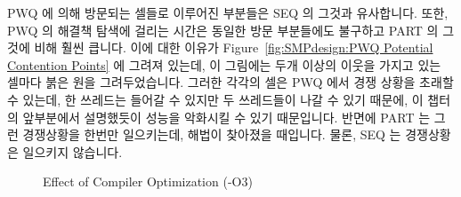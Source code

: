 PWQ 에 의해 방문되는 셀들로 이루어진 부분들은 SEQ 의 그것과 유사합니다.
또한, PWQ 의 해결책 탐색에 걸리는 시간은 동일한 방문 부분들에도 불구하고 PART
의 그것에 비해 훨씬 큽니다.
이에 대한 이유가 Figure~\ref{fig:SMPdesign:PWQ Potential Contention Points} 에
그려져 있는데, 이 그림에는 두개 이상의 이웃을 가지고 있는 셀마다 붉은 원을
그려두었습니다.
그러한 각각의 셀은 PWQ 에서 경쟁 상황을 초래할 수 있는데, 한 쓰레드는 들어갈 수
있지만 두 쓰레드들이 나갈 수 있기 때문에, 이 챕터의 앞부분에서 설명했듯이
성능을 악화시킬 수 있기 때문입니다.
반면에 PART 는 그런 경쟁상황을 한번만 일으키는데, 해법이 찾아졌을 때입니다.
물론, SEQ 는 경쟁상황은 일으키지 않습니다.

\begin{figure}[tb]
\begin{center}
\end{center}
\caption{Effect of Compiler Optimization (-O3)}
\label{fig:SMPdesign:Effect of Compiler Optimization (-O3)}
\end{figure}

